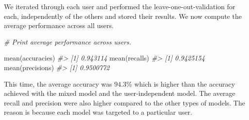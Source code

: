 \documentclass[
  11pt,
]{krantz}
\newenvironment{Shaded}{\begin{snugshade}}{\end{snugshade}}
\newcommand{\AttributeTok}[1]{\textcolor[rgb]{0.61,0.61,0.61}{#1}}
\newcommand{\CommentTok}[1]{\textcolor[rgb]{0.37,0.37,0.37}{\textit{#1}}}
\newcommand{\ConstantTok}[1]{\textcolor[rgb]{0,0,0}{#1}}
\newcommand{\FunctionTok}[1]{\textcolor[rgb]{0,0,0}{#1}}
\newcommand{\NormalTok}[1]{#1}
\newcommand{\OtherTok}[1]{\textcolor[rgb]{0.37,0.37,0.37}{#1}}
\newcommand{\SpecialCharTok}[1]{\textcolor[rgb]{0,0,0}{#1}}
\newcommand{\StringTok}[1]{\textcolor[rgb]{0.5,0.5,0.5}{#1}}
\begin{document}
\begin{Shaded}
\end{Shaded}

We iterated through each user and performed the leave-one-out-validation for each, independently of the others and stored their results. We now compute the average performance across all users.

\begin{Shaded}
\begin{Highlighting}[]
\CommentTok{\# Print average performance across users.}

\FunctionTok{mean}\NormalTok{(accuracies)}
\CommentTok{\#\textgreater{} [1] 0.943114}
\FunctionTok{mean}\NormalTok{(recalls)}
\CommentTok{\#\textgreater{} [1] 0.9425154}
\FunctionTok{mean}\NormalTok{(precisions)}
\CommentTok{\#\textgreater{} [1] 0.9500772}
\end{Highlighting}
\end{Shaded}

This time, the average accuracy was \(94.3\%\) which is higher than the accuracy achieved with the mixed model and the user-independent model. The average recall and precision were also higher compared to the other types of models. The reason is because each model was targeted to a particular user.
\end{document}

